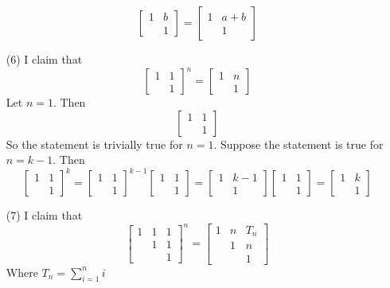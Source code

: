 \documentclass[12pt]{article}
\begin{document}
\begin{itemize}
$$\begin{bmatrix}
1 & b \\
& 1
\end{bmatrix} = \begin{bmatrix}
1 & a + b \\
& 1
\end{bmatrix}$$
\item[(6)]
I claim that
$$\begin{bmatrix}
1 & 1 \\
& 1
\end{bmatrix}^n = \begin{bmatrix}
1 & n \\
& 1
\end{bmatrix}$$
Let $n = 1$. Then
$$\begin{bmatrix}
1 & 1 \\
& 1
\end{bmatrix}$$
So the statement is trivially true for $n = 1$. Suppose the statement is true for $n = k - 1$. Then
$$\begin{bmatrix}
1 & 1 \\
& 1
\end{bmatrix}^k = \begin{bmatrix}
1 & 1 \\
& 1
\end{bmatrix}^{k-1}\begin{bmatrix}
1 & 1 \\
& 1
\end{bmatrix} = \begin{bmatrix}
1 & k - 1 \\
& 1
\end{bmatrix}\begin{bmatrix}
1 & 1 \\
& 1
\end{bmatrix} = \begin{bmatrix}
1 & k \\
& 1
\end{bmatrix}$$
\item[(7)]
I claim that
$$\begin{bmatrix}
1 & 1 & 1 \\
& 1 & 1 \\
& & 1
\end{bmatrix}^n = \begin{bmatrix}
1 & n & T_n \\
& 1 & n \\
& & 1
\end{bmatrix}$$
Where $T_n = \sum_{i=1}^n i$


\end{itemize}
\end{document}
